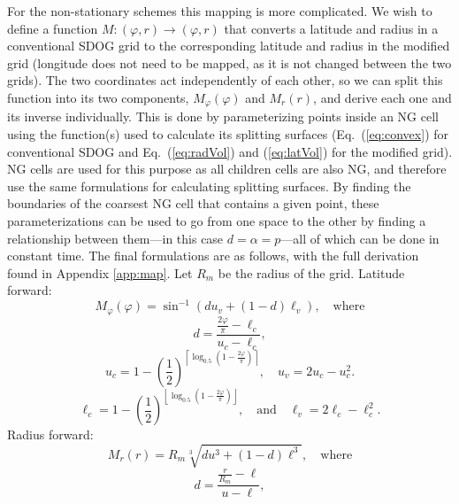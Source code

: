 For the non-stationary schemes this mapping is more complicated.
We wish to define a function $M \colon (\varphi, r) \rightarrow (\varphi, r)$ that converts a latitude and radius in a conventional SDOG grid to the corresponding latitude and radius in the modified grid (longitude does not need to be mapped, as it is not changed between the two grids).
The two coordinates act independently of each other, so we can split this function into its two components, $M_{\varphi}(\varphi)$ and $M_{r}(r)$, and derive each one and its inverse individually.
This is done by parameterizing points inside an NG cell using the function(s) used to calculate its splitting surfaces (Eq.~(\ref{eq:convex}) for conventional SDOG and Eq.~(\ref{eq:radVol}) and (\ref{eq:latVol}) for the modified grid).
NG cells are used for this purpose as all children cells are also NG, and therefore use the same formulations for calculating splitting surfaces.
By finding the boundaries of the coarsest NG cell that contains a given point, these parameterizations can be used to go from one space to the other by finding a relationship between them---in this case $d = \alpha = p$---all of which can be done in constant time.
The final formulations are as follows, with the full derivation found in Appendix \ref{app:map}.
Let $R_m$ be the radius of the grid.
Latitude forward:
%
\begin{equation*}
M_{\varphi}(\varphi) = \sin^{-1} \left( d u_{v} + \left( 1 - d \right) \ell_{v} \right), \quad \text{where}
\end{equation*}
%
\begin{equation*}
d = \frac{\frac{2\varphi}{\pi} - \ell_{c}}{u_{c} - \ell_{c}},
\end{equation*}
%
\begin{equation*}
u_{c} = 1 - \left( \frac{1}{2} \right)^{ \left\lceil \log_{0.5} \left( 1 - \frac{2\varphi}{\pi} \right) \right\rceil }, \quad u_{v} = 2 u_{c} - u_{c}^{2}.
\end{equation*}
%
\begin{equation*}
\ell_{c} = 1 - \left( \frac{1}{2} \right)^{ \left\lfloor \log_{0.5} \left( 1 - \frac{2\varphi}{\pi} \right) \right\rfloor }, \quad \text{and} \quad \ell_{v} = 2 \ell_{c} - \ell_{c}^{2}.
\end{equation*}
%
%
Radius forward:
%
\begin{equation*}
M_{r}(r) = R_{m} \sqrt[3]{ d u^{3} + \left( 1 - d \right) \ell^{3} }, \quad \text{where}
\end{equation*}
%
\begin{equation*}
d = \frac{\frac{r}{R_{m}} - \ell}{u - \ell},
\end{equation*}
